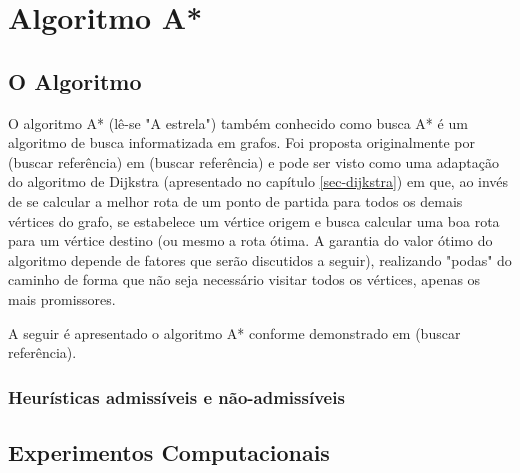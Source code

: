 \chapter{Algoritmo A*}
\label{sec-aestrela}

\section{O Algoritmo}
\label{sec-aestrela-algoritmo}
O algoritmo A* (lê-se "A estrela") também conhecido como busca A* é um algoritmo de busca informatizada em grafos. Foi proposta originalmente por (buscar referência) em (buscar referência) e pode ser visto como uma adaptação do algoritmo de Dijkstra (apresentado no capítulo \ref{sec-dijkstra}) em que, ao invés de se calcular a melhor rota de um ponto de partida para todos os demais vértices do grafo, se estabelece um vértice origem e busca calcular uma boa rota para um vértice destino (ou mesmo a rota ótima. A garantia do valor ótimo do algoritmo depende de fatores que serão discutidos a seguir), realizando "podas" do caminho de forma que não seja necessário visitar todos os vértices, apenas os mais promissores.

A seguir é apresentado o algoritmo A* conforme demonstrado em (buscar referência).


\subsection{Heurísticas admissíveis e não-admissíveis}
\label{sec-aestrela-algoritmo-heuristica}  

\section{Experimentos Computacionais}
\label{sec-aestrela-experimentos}
